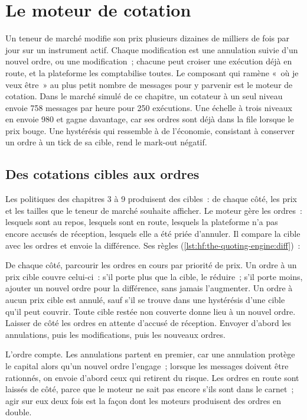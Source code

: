 \chapter{Le moteur de cotation}\label{ch:hf:the-quoting-engine}

Un teneur de marché modifie son prix plusieurs dizaines de milliers de fois par jour sur un instrument actif. Chaque modification est une annulation suivie d'un nouvel ordre, ou
une modification~; chacune peut croiser une exécution déjà en route, et la plateforme les comptabilise toutes. Le composant qui ramène «~où je veux être~» au
plus petit nombre de messages pour y parvenir est le moteur de cotation. Dans le marché simulé de ce chapitre, un cotateur à un seul niveau envoie 758 messages par heure pour 250
exécutions. Une échelle à trois niveaux en envoie 980 et gagne davantage, car ses ordres sont déjà dans la file lorsque le prix bouge. Une hystérésis qui ressemble à
de l'économie, consistant à conserver un ordre à un tick de sa cible, rend le mark-out négatif.

\section{Des cotations cibles aux ordres}

Les politiques des chapitres 3 à 9 produisent des cibles~: de chaque côté, les prix et les tailles que le teneur de marché souhaite afficher. Le moteur gère les ordres~:
lesquels sont au repos, lesquels sont en route, lesquels la plateforme n'a pas encore accusés de réception, lesquels elle a été priée d'annuler. Il compare la cible avec
les ordres et envoie la différence. Ses règles (\cref{lst:hf:the-quoting-engine:diff})~:

\begin{method}\label{met:hf:the-quoting-engine:diff}
De chaque côté, parcourir les ordres en cours par priorité de prix. Un ordre à un prix cible couvre celui-ci~: s'il porte plus que la cible, le réduire~;
s'il porte moins, ajouter un nouvel ordre pour la différence, sans jamais l'augmenter. Un ordre à aucun prix cible est annulé, sauf s'il se trouve dans une hystérésis
d'une cible qu'il peut couvrir. Toute cible restée non couverte donne lieu à un nouvel ordre. Laisser de côté les ordres en attente d'accusé de réception. Envoyer d'abord les annulations, puis
les modifications, puis les nouveaux ordres.
\end{method}

L'ordre compte. Les annulations partent en premier, car une annulation protège le capital alors qu'un nouvel ordre l'engage~; lorsque les messages doivent être rationnés, on envoie
d'abord ceux qui retirent du risque. Les ordres en route sont laissés de côté, parce que le moteur ne sait pas encore s'ils sont dans le carnet~; agir sur eux deux fois est la façon dont
les moteurs produisent des ordres en double.

